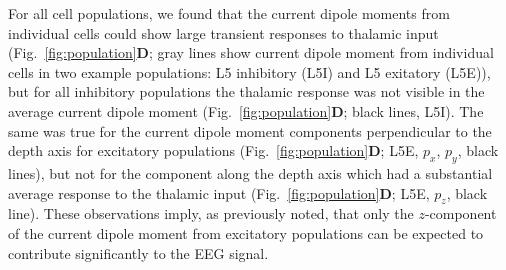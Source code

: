 \documentclass[preprint,10pt,authoryear]{elsarticle}
\begin{document}
For all cell populations, we found that the current dipole moments from individual cells could show large transient responses to thalamic input (Fig.~\ref{fig:population}\textbf{D}; gray lines show current dipole moment from individual cells in two example populations: L5 inhibitory (L5I) and L5 exitatory (L5E)), but for all inhibitory populations the thalamic response was not visible in the average current dipole moment (Fig.~\ref{fig:population}\textbf{D}; black lines, L5I). The same was true for the current dipole moment components perpendicular to the depth axis for excitatory populations (Fig.~\ref{fig:population}\textbf{D}; L5E, $p_x$, $p_y$, black lines), but not for the component along the depth axis which had a substantial average response to the thalamic input (Fig.~\ref{fig:population}\textbf{D}; L5E, $p_z$, black line). 
These observations imply, as previously noted, that only the $z$-component of the current dipole moment from excitatory populations can be expected to contribute significantly to the EEG signal.

\end{document}
